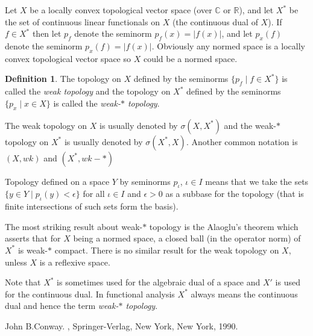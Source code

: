\documentclass[12pt]{article}
\theoremstyle{theorem}
\theoremstyle{definition}
\newtheorem*{defn}{Definition}
\theoremstyle{remark}
\begin{document}
Let $X$ be a locally convex topological vector space (over $\mathbb{C}$ or $\mathbb{R}$), and let $X^*$ be the set of continuous linear functionals on $X$ (the continuous dual of $X$). 
If $f \in X^*$ then let $p_{f}$ denote the seminorm $p_f(x) = \lvert f(x) \rvert$, and let $p_x(f)$ denote the seminorm $p_x(f) = \lvert f(x) \rvert$.
Obviously any normed space is a locally convex topological vector space so $X$ could be a normed space.

\begin{defn}
The topology on $X$ defined by the seminorms $\{ p_f \mid f \in X^* \}$ is called the {\em weak topology} and the topology on $X^*$ defined by the seminorms $\{ p_x \mid x \in X \}$ is called the {\em weak-$*$ topology}.
\end{defn}

The weak topology on $X$ is usually denoted by $\sigma(X,X^*)$ and the weak-$*$
topology on $X^*$ is usually denoted by $\sigma(X^*,X)$.  Another common notation is $(X,wk)$ and $(X^*,wk-*)$

Topology defined on a space $Y$ by seminorms $p_\iota$, $\iota \in I$ means that we take the sets $\{ y \in Y \mid p_\iota(y) < \epsilon \}$ for all $\iota \in I$ and $\epsilon > 0$ as a subbase for the topology (that is finite intersections of such sets form the basis).

The most striking result about weak-$*$ topology is the Alaoglu's theorem which asserts that for $X$ being a normed space, a closed ball (in the operator norm) of $X^*$ is weak-$*$ compact.  There is no similar result for the weak topology on $X$, unless $X$ is a reflexive space.

Note that $X^*$ is sometimes used for the algebraic dual of a space and $X'$ is used for the continuous dual.  In functional analysis $X^*$ always means the continuous dual and hence the term {\em weak-$*$ topology}.

\begin{thebibliography}{9}
John B.\@ Conway.
{\em {}},
Springer-Verlag, New York, New York, 1990.
\end{thebibliography}
\end{document}
